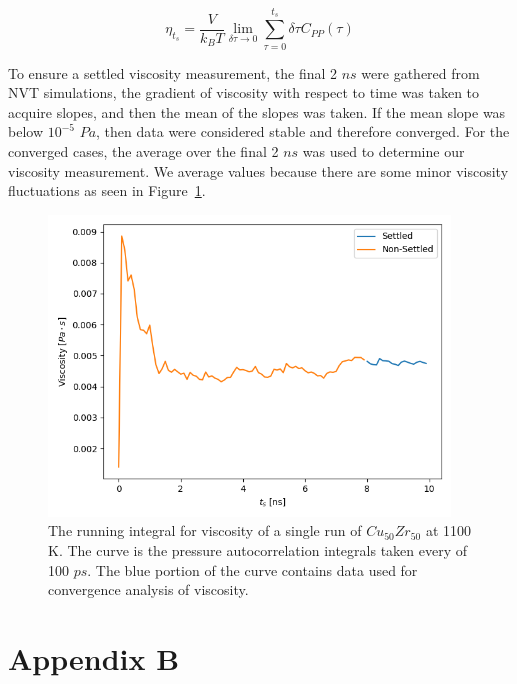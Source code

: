 \documentclass[11pt,a4paper]{article}                                %
\begin{document}
\begin{equation}\label{final_visc}
    \eta_{t_{s}} = \frac{V}{k_{B}T}  \lim_{\delta \tau \to 0} \sum_{\tau=0}^{t_{s}} \delta \tau C_{PP}(\tau)
\end{equation}

\par
To ensure a settled viscosity measurement, the final 2 $ns$ were gathered from NVT simulations, the gradient of viscosity with respect to time was taken to acquire slopes, and then the mean of the slopes was taken. If the mean slope was below $10^{-5}$ $Pa$, then data were considered stable and therefore converged. For the converged cases, the average over the final 2 $ns$ was used to determine our viscosity measurement. We average values because there are some minor viscosity fluctuations as seen in Figure~\ref{visc}.

\begin{figure}[H]
\centering
\includegraphics[width=0.95\textwidth]{figures/visc_cu50zr50_set_1-run_1_1100K.png}
\caption{The running integral for viscosity of a single run of $Cu_{50}Zr_{50}$ at 1100 K. The curve is the pressure autocorrelation integrals taken every of 100 $ps$. The blue portion of the curve contains data used for convergence analysis of viscosity.}
\label{visc}
\end{figure}

\section*{Appendix B}

\setcounter{equation}{0}
\renewcommand{\theequation}{B\arabic{equation}}
\end{document}
